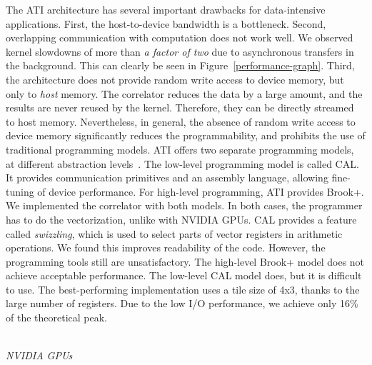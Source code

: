 \documentclass{article}
\begin{document}
\noindent The ATI architecture has several important
drawbacks for data-intensive applications.  First, the
host-to-device bandwidth is a bottleneck.  Second, 
overlapping communication with computation does not work well.
We observed kernel slowdowns of more than \emph{a factor of
two} due to asynchronous transfers in the background. This can clearly be seen in Figure~\ref{performance-graph}.
Third, the architecture does not provide random write access to device
memory, but only to \emph{host} memory.
The correlator reduces the data by a large amount, and the
results are never reused by the kernel. Therefore, they can be
directly streamed to host memory. Nevertheless, in general, the absence of random
write access to device memory significantly reduces the programmability, and prohibits the use
of traditional programming models.
ATI offers two separate programming models, at different abstraction
levels~\cite{amd-manual}.  The low-level programming model is called CAL.  
It provides communication primitives and
an assembly language, allowing fine-tuning of device
performance. For high-level programming, ATI provides Brook+.  We
implemented the correlator with both models.
In both cases, the programmer has to do the vectorization,
unlike with NVIDIA GPUs.  CAL provides a feature called
\emph{swizzling}, which is used to select parts of vector registers in
arithmetic operations.  We found this improves readability of the code. 
However, the
programming tools still are unsatisfactory. The high-level Brook+ model does
not achieve acceptable performance. The low-level
CAL model does, but it is difficult to use.
The best-performing implementation uses a tile size of 4x3, thanks to
the large number of registers.  
Due to the low I/O performance, we achieve only 16\% of the theoretical peak.



\noindent \\ \emph{NVIDIA GPUs}
\end{document}
